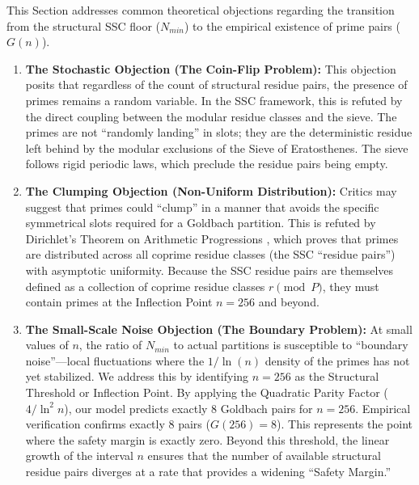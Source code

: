 \documentclass[twoside,9pt]{extarticle}
\begin{document}
This Section addresses common theoretical objections regarding the transition from the structural SSC floor ($N_{min}$) to the empirical existence of prime pairs ($G(n)$).

\begin{enumerate}
    \item \textbf{The Stochastic Objection (The Coin-Flip Problem):}
    This objection posits that regardless of the count of structural residue pairs, the presence of primes remains a random variable. In the SSC framework, this is refuted by the direct coupling between the modular residue classes and the sieve. The primes are not ``randomly landing'' in slots; they are the deterministic residue left behind by the modular exclusions of the Sieve of Eratosthenes. The sieve follows rigid periodic laws, which preclude the residue pairs being empty.
    
    \item \textbf{The Clumping Objection (Non-Uniform Distribution):}
    Critics may suggest that primes could ``clump'' in a manner that avoids the specific symmetrical slots required for a Goldbach partition. This is refuted by Dirichlet’s Theorem on Arithmetic Progressions \cite{dirichlet}, which proves that primes are distributed across all coprime residue classes (the SSC ``residue pairs'') with asymptotic uniformity. Because the SSC residue pairs are themselves defined as a collection of coprime residue classes $r \pmod{P}$, they must contain primes at the Inflection Point $n = 256$ and beyond. 

    \item \textbf{The Small-Scale Noise Objection (The Boundary Problem):}
    At small values of $n$, the ratio of $N_{min}$ to actual partitions is susceptible to ``boundary noise''—local fluctuations where the $1/\ln(n)$ density of the primes has not yet stabilized. We address this by identifying $n = 256$ as the Structural Threshold or Inflection Point. By applying the Quadratic Parity Factor ($4/\ln^2 n$), our model predicts exactly 8 Goldbach pairs for $n=256$. Empirical verification confirms exactly 8 pairs ($G(256)=8$). This represents the point where the safety margin is exactly zero. Beyond this threshold, the linear growth of the interval $n$ ensures that the number of available structural residue pairs diverges at a rate that provides a widening ``Safety Margin.''


\end{enumerate}
\end{document}
